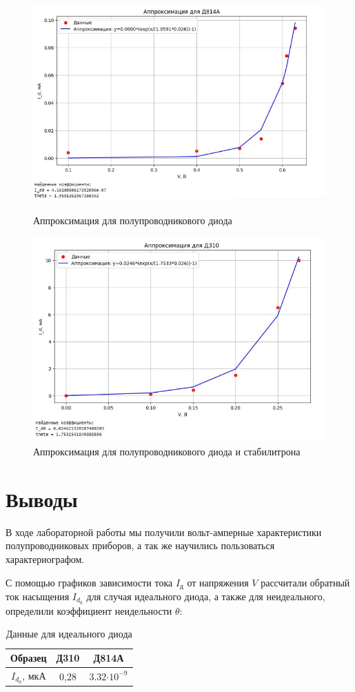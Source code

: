 \documentclass[a4paper, 12pt]{article}
\begin{document}
\begin{figure}[h]
    \centering
    \includegraphics[width =0.72 \linewidth]{img/photo_2025-02-12_03-14-46.jpg}
    \caption{Аппроксимация для полупроводникового диода}

\includegraphics[width =0.72 \linewidth]{img/photo_2025-02-12_03-14-48.jpg}
    \caption{Аппроксимация для полупроводникового диода и стабилитрона}
\end{figure}



\section{Выводы}
В ходе лабораторной работы мы получили вольт-амперные характеристики полупроводниковых приборов, а так же научились пользоваться характериографом. 

С помощью графиков зависимости тока $I_\text{д}$ от напряжения $V$ рассчитали обратный ток насыщения $I_{d_0}$ для случая идеального диода, а также для неидеального, определили коэффициент неидельности $\theta$:

\begin{table}[h]
\centering
\begin{tabular}{|c|c|c|}
\hline
Образец & Д310   & Д814А \\ \hline
$I_{d_0}$, мкА & 0,28 & 3.32$\cdot 10^{-9}$ \\ \hline
\end{tabular}
\caption{Данные для идеального диода}
\end{table}
\end{document}
